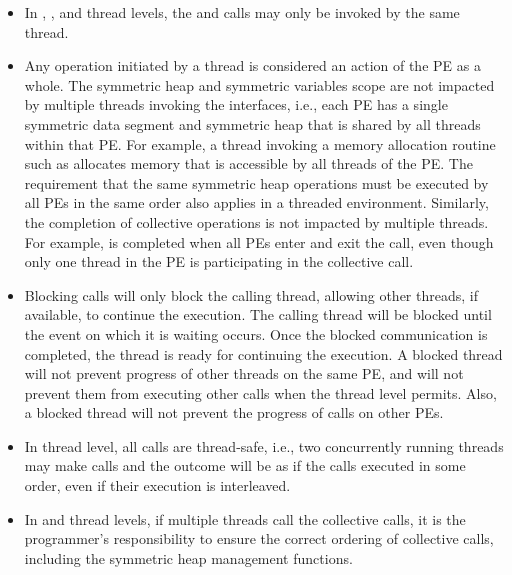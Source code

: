 \begin{itemize}
\item
In , , and  thread
levels, the  and  calls may only be invoked by the same thread.

\item
Any \openshmem operation initiated by a thread is considered an action of the \ac{PE} as a whole.
The symmetric heap and symmetric variables scope
are not impacted by multiple threads invoking the
\openshmem interfaces, i.e., 
each \ac{PE} has a single symmetric data segment and symmetric heap that is shared by
all threads within that \ac{PE}.  For example, a thread invoking a memory allocation
routine such as  
allocates memory that is accessible by all threads of the \ac{PE}. 
The requirement that the same symmetric heap operations must
be executed by all \acp{PE} in the same order also applies in a threaded
environment. Similarly, the completion of collective operations is not impacted by multiple threads. 
For example,  is completed when all \acp{PE} enter and
exit the  call, even though only one thread in the \ac{PE} is
participating in the collective call. 


\item Blocking \openshmem calls will only block the calling thread, allowing
other threads, if available, to continue the execution. The calling thread will be blocked until the
event on which it is waiting occurs. Once the blocked communication is
completed, the thread is ready for continuing the execution. A blocked thread
will not prevent progress of other threads on the same \ac{PE}, and will not
prevent them from executing other \openshmem calls when the thread level permits. 
Also, a blocked thread will not prevent the progress of \openshmem calls on other \acp{PE}. 

\item In  thread level, all \openshmem calls are thread-safe, 
i.e., two concurrently running threads may make \openshmem calls and the outcome will be as if the calls executed in
some order, even if their execution is interleaved.

\item In  and  thread levels, 
if multiple threads call the collective calls, it is the programmer's responsibility to ensure the correct ordering of
collective calls, including the symmetric heap management functions.

\end{itemize} 
